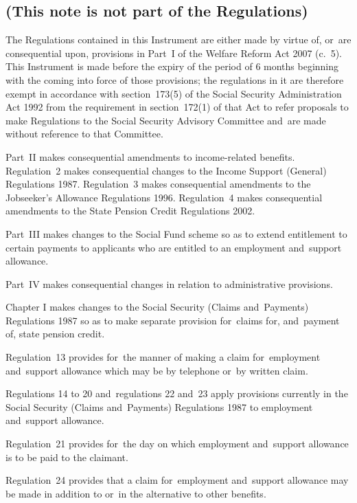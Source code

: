 \documentclass[12pt,a4paper]{article}
\begin{document}
\renewcommand\parthead{— Explanatory Note}

\subsection*{(This note is not part of the Regulations)}

The Regulations contained in this Instrument are either made by virtue of, or~are consequential upon, provisions in Part~I of the Welfare Reform Act 2007 (c.~5). This Instrument is made before the expiry of the period of 6 months beginning with the coming into force of those provisions; the regulations in it are therefore exempt in accordance with section~173(5) of the Social Security Administration Act 1992 from the requirement in section~172(1) of that Act to refer proposals to make Regulations to the Social Security Advisory Committee and~are made without reference to that Committee.

Part~II makes consequential amendments to income-related benefits. Regulation~2 makes consequential changes to the Income Support (General) Regulations 1987. Regulation~3 makes consequential amendments to the Jobseeker’s Allowance Regulations 1996. Regulation~4 makes consequential amendments to the State Pension Credit Regulations 2002.

Part~III makes changes to the Social Fund scheme so as to extend entitlement to certain payments to applicants who are entitled to an employment and~support allowance.

Part~IV makes consequential changes in relation to administrative provisions.

Chapter I makes changes to the Social Security (Claims and~Payments) Regulations 1987 so as to make separate provision for~claims for, and~payment of, state pension credit.

Regulation~13 provides for~the manner of making a claim for~employment and~support allowance which may be by telephone or~by written claim.

Regulations 14 to 20 and~regulations 22 and~23 apply provisions currently in the Social Security (Claims and~Payments) Regulations 1987 to employment and~support allowance.

Regulation~21 provides for~the day on which employment and~support allowance is to be paid to the claimant.

Regulation~24 provides that a claim for~employment and~support allowance may be made in addition to or~in the alternative to other benefits.
\end{document}
